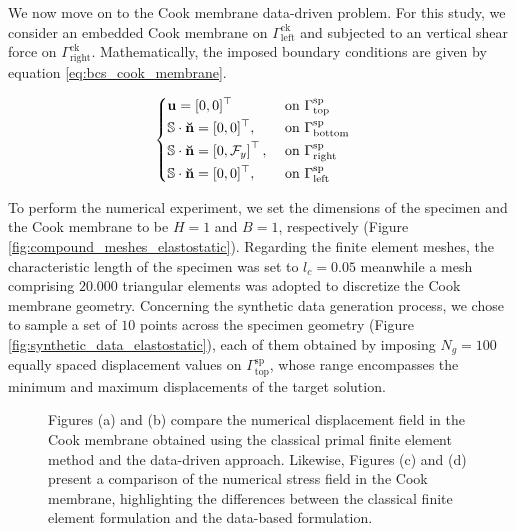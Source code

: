 We now move on to the Cook membrane data-driven problem. For this study, we consider an embedded Cook membrane on $\Gamma_{\text{left}}^{\text{ck}}$ and subjected to an vertical shear force on $\Gamma_{\text{right}}^{\text{ck}}$. Mathematically, the imposed boundary conditions are given by equation \ref{eq:bcs_cook_membrane}.

\begin{equation}\label{eq:bcs_cook_membrane}
	\begin{cases}
		\begin{aligned}
		&\mathbf{u} = [0,0]^{\top}&&\text{on}~\Gamma_{\text{top}}^{\text{sp}} \\
		&\mathbb{S} \cdot \mathbf{\breve{n}} = [0,0]^{\top},~&&\text{on}~\Gamma_{\text{bottom}}^{\text{sp}}\\
		&\mathbb{S} \cdot \mathbf{\breve{n}} = \left[0,\mathcal{F}_{y}\right]^{\top},~&&\text{on}~\Gamma_{\text{right}}^{\text{sp}} \\
		&\mathbb{S} \cdot \mathbf{\breve{n}} = [0,0]^{\top},~&&\text{on}~\Gamma_{\text{left}}^{\text{sp}}\\
		\end{aligned}
	\end{cases}
\end{equation}

To perform the numerical experiment, we set the dimensions of the specimen and the Cook membrane to be $ H=1 $ and $ B=1 $, respectively (Figure \ref{fig:compound_meshes_elastostatic}). Regarding the finite element meshes, the characteristic length of the specimen was set to $ l_c = 0.05 $ meanwhile a mesh comprising $ 20.000 $ triangular elements was adopted to discretize the Cook membrane geometry. Concerning the synthetic data generation process, we chose to sample a set of $ 10 $ points across the specimen geometry (Figure \ref{fig:synthetic_data_elastostatic}), each of them obtained by imposing $ N_{g}=100 $ equally spaced displacement values on $ \Gamma_{\text{top}}^{\text{sp}} $, whose range encompasses the minimum and maximum displacements of the target solution. 

\begin{figure}[h!]
	\centering
	\caption{Figures (a) and (b) compare the numerical displacement field in the Cook membrane obtained using the classical primal finite element method and the data-driven approach. Likewise, Figures (c) and (d) present a comparison of the numerical stress field in the Cook membrane, highlighting the differences between the classical finite element formulation and the data-based formulation. }
	\def\svgwidth{\columnwidth}  
	  
	\label{fig:ddcm_cook_membrane}  
\end{figure}

